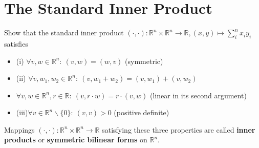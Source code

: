 \section{The Standard Inner Product}

Show that the standard inner product $(\cdot,\cdot)\colon \mathbb{R}^n\times \mathbb{R}^n \to \mathbb{R}, (x,y) \mapsto \sum_i^n x_i y_i$ satisfies
\begin{itemize}
    \item(i) $\forall v,w \in \mathbb{R}^n: ~(v,w) = (w,v)$ (symmetric)
    \item(ii) $\forall v,w_1,w_2 \in \mathbb{R}^n: ~(v,w_1+w_2) = (v,w_1)+(v,w_2)$
    \item $\forall v,w \in \mathbb{R}^n, r \in \mathbb{R}: ~ (v,r\cdot w)=r\cdot(v,w)$ (linear in its second argument)
    \item (iii)$\forall v \in \mathbb{R}^n\backslash\{0\}: ~ (v,v) > 0$ (positive definite)
\end{itemize}

Mappings $(\cdot,\cdot)\colon \mathbb{R}^n\times \mathbb{R}^n \to \mathbb{R}$ satisfying these three properties are called \textbf{inner products} or \textbf{symmetric bilinear forms} on $\mathbb{R}^n$.
